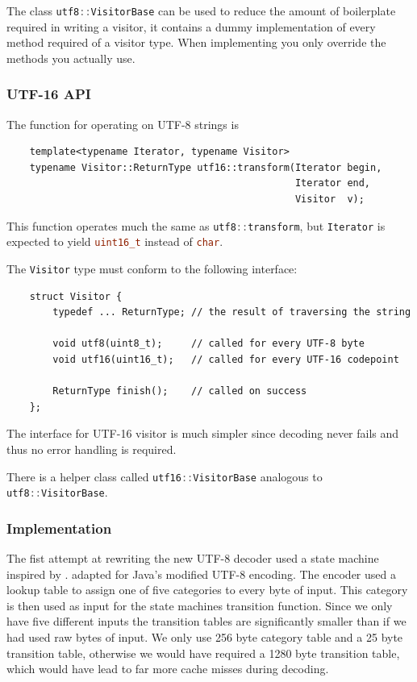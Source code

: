 \documentclass[12pt,a4paper,oneside]{article}
\newcommand{\cpp}[1]{\lstinline[language=C++]{#1}}
\begin{document}
	The class \cpp{utf8::VisitorBase} can be used to reduce the amount of boilerplate required in writing a visitor,
	it contains a dummy implementation of every method required of a visitor type.
	When implementing you only override the methods you actually use.

\subsubsection{UTF-16 API}
	The function for operating on UTF-8 strings is
		\begin{lstlisting}
	template<typename Iterator, typename Visitor>
	typename Visitor::ReturnType utf16::transform(Iterator begin,
	                                              Iterator end, 
	                                              Visitor  v);
		\end{lstlisting}

	This function operates much the same as \cpp{utf8::transform}, but \cpp{Iterator} is expected to 
	yield \cpp{uint16_t} instead of \cpp{char}.

	The \cpp{Visitor} type must conform to the following interface:
		\begin{lstlisting}
	struct Visitor {
		typedef ... ReturnType; // the result of traversing the string

		void utf8(uint8_t);     // called for every UTF-8 byte
		void utf16(uint16_t);   // called for every UTF-16 codepoint

		ReturnType finish();    // called on success
	};
		\end{lstlisting}

	The interface for UTF-16 visitor is much simpler since decoding never fails and thus no error handling is required.

	There is a helper class called \cpp{utf16::VisitorBase} analogous to \cpp{utf8::VisitorBase}.

\subsubsection{Implementation}
	The fist attempt at rewriting the new UTF-8 decoder used a state machine inspired by \cite{utf8decoder}.
	adapted for Java's modified UTF-8 encoding.
	The encoder used a lookup table to assign one of five categories to every byte of input.
	This category is then used as input for the state machines transition function.
	Since we only have five different inputs the transition tables are significantly smaller than if we had
	used raw bytes of input.
	We only use 256 byte category table and a 25 byte transition table, otherwise we would have required a 
	1280 byte transition table, which would have lead to far more cache misses during decoding.
\end{document}

